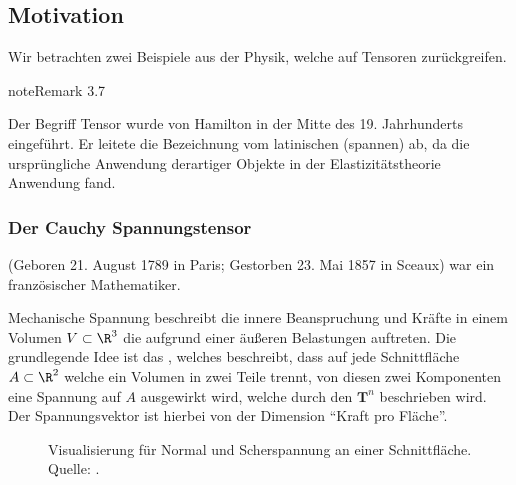 \documentclass[letterpaper,10pt,english]{jupyterBook}
\let\sphinxpxdimen\pdfpxdimen\else\newdimen\sphinxpxdimen
\begin{document}
\subsection{Motivation}
\label{\detokenize{vektoranalysis/tensor:motivation}}
\sphinxAtStartPar
Wir betrachten zwei Beispiele aus der Physik, welche auf Tensoren zurückgreifen.
\label{vektoranalysis/tensor:remark-0}
\begin{sphinxadmonition}{note}{Remark 3.7}



\sphinxAtStartPar
Der Begriff Tensor wurde von Hamilton in der Mitte des 19. Jahrhunderts eingeführt. Er leitete die Bezeichnung vom latinischen  (spannen) ab, da die ursprüngliche Anwendung derartiger Objekte in der Elastizitätstheorie Anwendung fand.
\end{sphinxadmonition}


\subsubsection{Der Cauchy Spannungstensor}
\label{\detokenize{vektoranalysis/tensor:der-cauchy-spannungstensor}}
\begin{sphinxShadowBox}

\sphinxAtStartPar
{} (Geboren 21. August 1789 in Paris; Gestorben 23. Mai 1857 in Sceaux) war ein französischer Mathematiker.
\end{sphinxShadowBox}

\sphinxAtStartPar
Mechanische Spannung beschreibt die innere Beanspruchung und Kräfte in einem Volumen \(V\subset\R^3\) die aufgrund einer äußeren Belastungen auftreten. Die grundlegende Idee ist das , welches beschreibt, dass auf jede Schnittfläche \(A\subset\R^2\) welche ein Volumen in zwei Teile trennt, von diesen zwei Komponenten eine Spannung auf \(A\) ausgewirkt wird, welche durch den  \(\mathbf{T}^n\) beschrieben wird. Der Spannungsvektor ist hierbei von der Dimension “Kraft pro Fläche”.

\begin{figure}[htbp]
\centering
\capstart

\noindent\sphinxincludegraphics[height=250\sphinxpxdimen]{{stress_vector}.png}
\caption{Visualisierung für Normal\sphinxhyphen{} und Scherspannung an einer Schnittfläche. Quelle: .}\label{\detokenize{vektoranalysis/tensor:fig-stress}}\end{figure}
\end{document}
